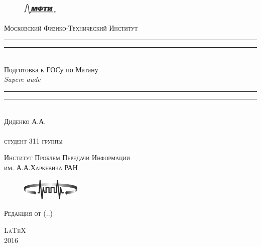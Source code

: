 \begin{titlepage}
\centering
\settowidth{\unitlength}{ПОДГОТОВКА К ГОСУ ПО МАТАНУ ыыыыыыыыыыыыыыыыыыыыыыыыыыыыыыыыыы}

\begin{figure}[!h]
\center
\includegraphics[width=0.15\textwidth]{pictures/MIPT2}
\end{figure}
\vspace*{\baselineskip}
{\LARGE\scshape Московский Физико-Технический Институт}\\[\baselineskip]
\rule{\unitlength}{1.6pt}\vspace*{-\baselineskip}\vspace*{2pt}
\rule{\unitlength}{0.4pt}\\[1.8\baselineskip]
{\Huge Подготовка к ГОСу по Матану}\\[\baselineskip]
{\large \itshape Sapere aude}\\[0.7\baselineskip]
\rule{\unitlength}{0.4pt}\vspace*{-\baselineskip}\vspace{3.2pt}
\rule{\unitlength}{1.6pt}\\[\baselineskip]
{\Large\scshape Диденко А.А. \\ $ $\\студент 311 группы}\par
\vspace*{5\baselineskip}  

{\LARGE\scshape Институт Проблем Передачи Информации \\им. А.А.Харкевича РАН}
\begin{figure}[!h]
\centering
\includegraphics[width=0.25\textwidth]{pictures/IITP2}
\end{figure}


{\LARGE\scshape Редакция от \currenttime \;(\twodigit\day.\twodigit\month.\the\year)}\par %
\vfill
{\LARGE\scshape \LaTeX}\\[\baselineskip]
{\LARGE\scshape 2016}\par
\end{titlepage}